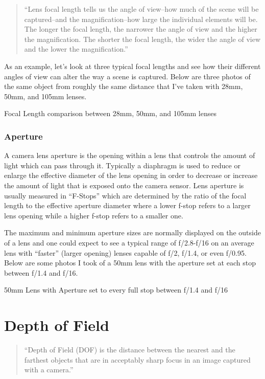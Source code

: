 \documentclass[10pt]{article}
\begin{document}
\begin{quote}
``Lens focal length tells us the angle of view--how much of the scene
will be captured--and the magnification--how large the individual
elements will be. The longer the focal length, the narrower the angle of
view and the higher the magnification. The shorter the focal length, the
wider the angle of view and the lower the magnification.''
\end{quote}

As an example, let's look at three typical focal lengths and see how
their different angles of view can alter the way a scene is captured.
Below are three photos of the same object from roughly the same distance
that I've taken with 28mm, 50mm, and 105mm lenses.

    Focal Length comparison between 28mm, 50mm, and 105mm lenses

    \subsubsection{Aperture}\label{aperture}

A camera lens aperture is the opening within a lens that controls the
amount of light which can pass through it. Typically a diaphragm is used
to reduce or enlarge the effective diameter of the lens opening in order
to decrease or increase the amount of light that is exposed onto the
camera sensor. Lens aperture is usually measured in ``F-Stops'' which
are determined by the ratio of the focal length to the effective
aperture diameter where a lower f-stop refers to a larger lens opening
while a higher f-stop refers to a smaller one.

The maximum and minimum aperture sizes are normally displayed on the
outside of a lens and one could expect to see a typical range of
f/2.8-f/16 on an average lens with ``faster'' (larger opening) lenses
capable of f/2, f/1.4, or even f/0.95. Below are some photos I took of a
50mm lens with the aperture set at each stop between f/1.4 and f/16.

    50mm Lens with Aperture set to every full stop between f/1.4 and f/16

    \section{Depth of Field}\label{depth-of-field}

\begin{quote}
``Depth of Field (DOF) is the distance between the nearest and the
farthest objects that are in acceptably sharp focus in an image captured
with a camera.''
\end{quote}
\end{document}

